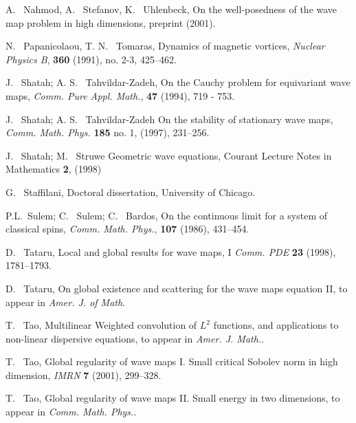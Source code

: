 \documentclass[draft,11pt,leqno]{amsart}
\begin{document}
\begin{thebibliography}{100}
 A. ~Nahmod, A. ~Stefanov, K. ~Uhlenbeck, On the 
well-posedness of the wave map 
problem in high dimensions, preprint (2001). 

 N. ~Papanicolaou, T. N. ~Tomaras, Dynamics of magnetic 
vortices, {\em Nuclear Physics B}, {\bf 360} (1991), no. 2-3, 425--462.

 J. ~Shatah;  A. S. ~Tahvildar-Zadeh, On the Cauchy
  problem for equivariant wave maps, {\em Comm. Pure Appl. Math.}, {\bf 47} (1994), 719 - 753.  

 J. ~Shatah;  A. S. ~Tahvildar-Zadeh  On the stability
  of stationary wave maps, {\em Comm. Math. Phys.} {\bf 185} no. 1, (1997),  231--256. 

 J. ~Shatah; M. ~Struwe Geometric wave equations,
  Courant Lecture Notes in Mathematics {\bf 2}, (1998) 


 G. ~Staffilani, Doctoral dissertation,
University of Chicago.


  P.L.~Sulem; C. ~Sulem; C. ~Bardos, 
On the continuous limit for a system of classical spins, {\em Comm. Math. Phys.}, {\bf 107} (1986),  431--454. 

 D. ~Tataru, Local and global results for wave maps, I {\em Comm. PDE} {\bf 23} (1998), 1781--1793.

 D. ~Tataru, On global existence and scattering for the wave maps equation II, to appear in {\em Amer. J. of Math}.

 T. ~Tao, Multilinear Weighted convolution of
$L^2$ functions, and applications to non-linear dispersive equations,
to appear in {\em Amer. J. Math.}.

 T. ~Tao, Global regularity of wave maps I.  Small critical
 Sobolev norm in high dimension, {\em IMRN} {\bf 7} (2001), 299--328.

 T. ~Tao, Global regularity of wave maps II.  Small energy 
in two dimensions, to appear in {\em Comm. Math. Phys.}.
\end{thebibliography}
 
\end{document}
